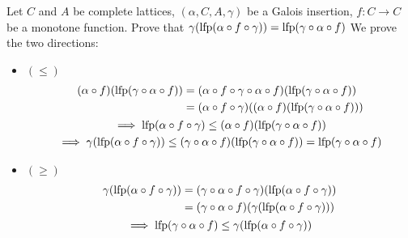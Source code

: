 \begin{exercise}{
    Let $C$ and $A$ be complete lattices, $(\alpha, C, A, \gamma)$ be a Galois insertion, $f: C \to C$ be a monotone function. Prove that $\gamma(\operatorname{lfp}(\alpha \circ f \circ \gamma)) = \operatorname{lfp}(\gamma \circ \alpha \circ f)$
}
    We prove the two directions:
    \begin{itemize}
        \item $(\leq)$
        \begin{gather*}
            \begin{aligned}
                (\alpha \circ f)(\operatorname{lfp}(\gamma \circ \alpha \circ f))
                &= (\alpha \circ f \circ \gamma \circ \alpha \circ f)(\operatorname{lfp}(\gamma \circ \alpha \circ f)) \\
                &= (\alpha \circ f \circ \gamma)((\alpha \circ f)(\operatorname{lfp}(\gamma \circ \alpha \circ f)))
            \end{aligned} \\
            \implies \operatorname{lfp}(\alpha \circ f \circ \gamma) \leq (\alpha \circ f)(\operatorname{lfp}(\gamma \circ \alpha \circ f)) \\
            \implies \gamma(\operatorname{lfp}(\alpha \circ f \circ \gamma)) \leq (\gamma \circ \alpha \circ f)(\operatorname{lfp}(\gamma \circ \alpha \circ f)) = \operatorname{lfp}(\gamma \circ \alpha \circ f)
        \end{gather*}
        \item $(\geq)$
        \begin{gather*}
            \begin{aligned}
                \gamma(\operatorname{lfp}(\alpha \circ f \circ \gamma))
                &= (\gamma \circ \alpha \circ f \circ \gamma) (\operatorname{lfp}(\alpha \circ f \circ \gamma)) \\
                &= (\gamma \circ \alpha \circ f)(\gamma(\operatorname{lfp}(\alpha \circ f \circ \gamma)))
            \end{aligned} \\
            \implies \operatorname{lfp}(\gamma \circ \alpha \circ f) \leq \gamma(\operatorname{lfp}(\alpha \circ f \circ \gamma))
        \end{gather*}
    \end{itemize}
\end{exercise}
